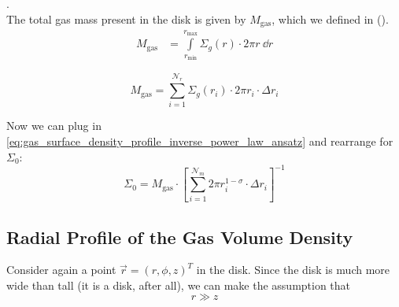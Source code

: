         . \\

        The total gas mass present in the disk is given by $M_\text{gas}$, which we defined in 
        (). \\
        \begin{align}
            M_\text{gas}
                &= \int\limits_{r_\text{min}}^{r_\text{max}} \Sigma_g(r) \cdot 2\pi r \ \dd r
        \end{align}

        \begin{equation}
            M_\text{gas}
                = \sum_{i=1}^{\mathcal N_r} \Sigma_g(r_i) \cdot 2\pi r_i \cdot \Delta r_i
        \end{equation}

        Now we can plug in \cref{eq:gas_surface_density_profile_inverse_power_law_ansatz} and 
        rearrange for $\Sigma_0$:
        \begin{equation}
            \Sigma_0
                = M_\text{gas} \cdot \left[
                    \sum_{i=1}^{\mathcal N_m} 2\pi r_i^{1-\sigma} \cdot \Delta r_i
                \right]^{-1}
        \end{equation}

    \newpage\subsection{Radial Profile of the Gas Volume Density}
        
        Consider again a point $\vec r=(r,\phi,z)^T$ in the disk. Since the disk is much more wide 
        than tall (it is a disk, after all), we can make the assumption that
        \begin{equation}
            \label{eq:r_much_bigger_than_z}
            r\gg z 
        \end{equation}

